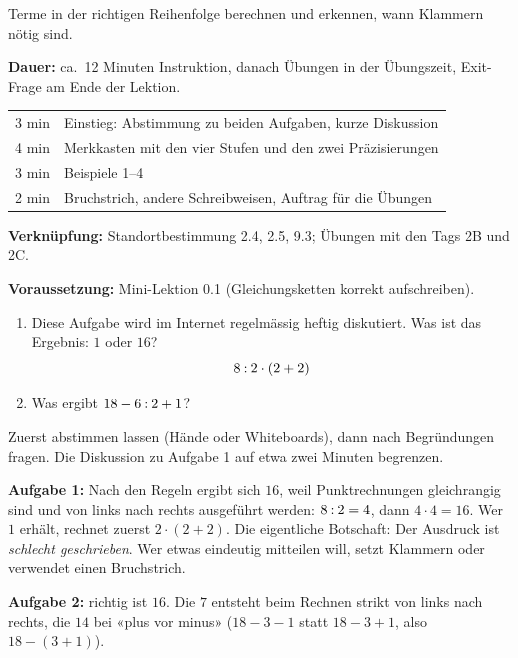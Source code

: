 \documentclass[11pt]{exam}
\begin{document}
  {Terme in der richtigen Reihenfolge berechnen und erkennen, wann Klammern
   nötig sind.}

\begin{lehrperson}[Ablauf]
\textbf{Dauer:} ca.\ 12 Minuten Instruktion, danach Übungen in der Übungszeit,
Exit-Frage am Ende der Lektion.

\begin{tabular}{@{}ll@{}}
  3 min & Einstieg: Abstimmung zu beiden Aufgaben, kurze Diskussion \\
  4 min & Merkkasten mit den vier Stufen und den zwei Präzisierungen \\
  3 min & Beispiele 1–4 \\
  2 min & Bruchstrich, andere Schreibweisen, Auftrag für die Übungen
\end{tabular}

\textbf{Verknüpfung:} Standortbestimmung 2.4, 2.5, 9.3; Übungen mit den Tags
2B und 2C.

\textbf{Voraussetzung:} Mini-Lektion 0.1 (Gleichungsketten korrekt
aufschreiben).
\end{lehrperson}


\begin{einstieg}
\begin{enumerate}
  \item Diese Aufgabe wird im Internet regelmässig heftig diskutiert.
        Was ist das Ergebnis: $1$ oder $16$?
        \[ 8 \mathbin{:} 2 \cdot (2 + 2) \]
  \item Was ergibt $18 - 6 \mathbin{:} 2 + 1$? \quad
        \quad {}\quad {}
\end{enumerate}
\end{einstieg}

\begin{lehrperson}[Einstieg]
Zuerst abstimmen lassen (Hände oder Whiteboards), dann nach Begründungen
fragen. Die Diskussion zu Aufgabe 1 auf etwa zwei Minuten begrenzen.

\textbf{Aufgabe 1:} Nach den Regeln ergibt sich $16$, weil Punktrechnungen
gleichrangig sind und von links nach rechts ausgeführt werden:
$8 \mathbin{:} 2 = 4$, dann $4 \cdot 4 = 16$. Wer $1$ erhält, rechnet zuerst
$2 \cdot (2 + 2)$. Die eigentliche Botschaft: Der Ausdruck ist
\emph{schlecht geschrieben}. Wer etwas eindeutig mitteilen will, setzt
Klammern oder verwendet einen Bruchstrich.

\textbf{Aufgabe 2:} richtig ist $16$. Die $7$ entsteht beim Rechnen strikt von
links nach rechts, die $14$ bei «plus vor minus» ($18 - 3 - 1$ statt
$18 - 3 + 1$, also $18 - (3 + 1)$).
\end{lehrperson}
\end{document}

